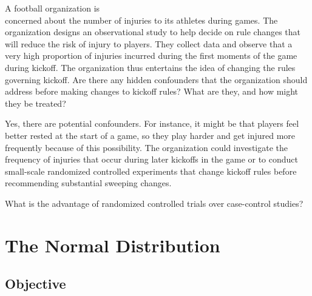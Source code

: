 \documentclass[11pt, chapterprefix=true]{scrbook}\usepackage[]{graphicx}\usepackage[]{color}
\begin{document}
\begin{exercises}
  \begin{exercise} %

A football organization is \\ concerned about the number of injuries to its athletes during games. The organization designs an observational study to help decide on rule changes that will reduce the risk of injury to players. They collect data and observe that a very high proportion of injuries incurred during the first moments of the game during kickoff. The organization thus entertains the idea of changing the rules governing kickoff. Are there any hidden confounders that the organization should address before making changes to kickoff rules? What are they, and how might they be treated?

	\end{exercise}
	\begin{solution}  %

Yes, there are potential confounders. For instance, it might be that players feel better rested at the start of a game, so they play harder and get injured more frequently because of this possibility. The organization could investigate the frequency of injuries that occur during later kickoffs in the game or to conduct small-scale randomized controlled experiments that change kickoff rules before recommending substantial sweeping changes.

	\end{solution}

	  \begin{exercise} %

What is the advantage of randomized controlled trials over case-control studies?

  \end{exercise}

\end{exercises}

\onecolumn



\chapter{The Normal Distribution}
\label{chap:ch6}

\section{Objective}
\end{document}
